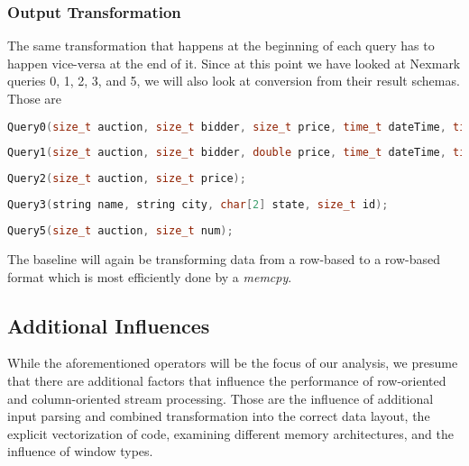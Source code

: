 \subsubsection{Output Transformation}

The same transformation that happens at the beginning of each query has to happen vice-versa at the end of it.
Since at this point we have looked at Nexmark queries 0, 1, 2, 3, and 5, we will also look at conversion from their result schemas.
Those are

\begin{lstlisting}[language=c++]
Query0(size_t auction, size_t bidder, size_t price, time_t dateTime, time_t expires, string extra);
\end{lstlisting}

\begin{lstlisting}[language=c++]
Query1(size_t auction, size_t bidder, double price, time_t dateTime, time_t expires, string extra);
\end{lstlisting}

\begin{lstlisting}[language=c++]
Query2(size_t auction, size_t price);
\end{lstlisting}
    
\begin{lstlisting}[language=c++]
Query3(string name, string city, char[2] state, size_t id);
\end{lstlisting}

\begin{lstlisting}[language=c++]
Query5(size_t auction, size_t num);
\end{lstlisting}

The baseline will again be transforming data from a row-based to a row-based format which is most efficiently done by a \emph{memcpy}.

\subsection{Additional Influences}

While the aforementioned operators will be the focus of our analysis, we presume that there are additional factors that influence the performance of row-oriented and column-oriented stream processing.
Those are the influence of additional input parsing and combined transformation into the correct data layout, the explicit vectorization of code, examining different memory architectures, and the influence of window types.

